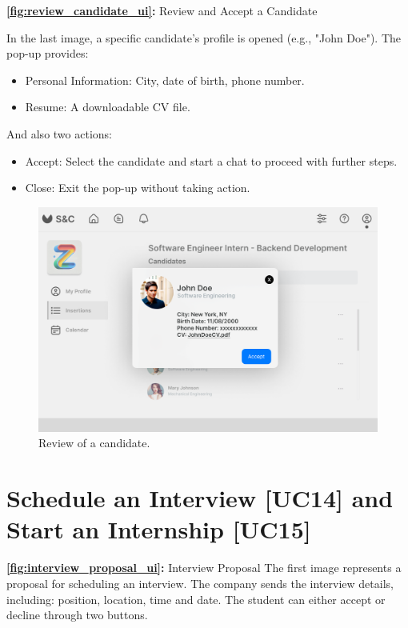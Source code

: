 \newpage

\textbf{\autoref{fig:review_candidate_ui}:} Review and Accept a Candidate

In the last image, a specific candidate’s profile is opened (e.g., "John Doe"). The pop-up provides:

\begin{itemize}
    \item
Personal Information: City, date of birth, phone number.
    \item
Resume: A downloadable CV file.
\end{itemize}

And also two actions:

\begin{itemize}
    \item
Accept: Select the candidate and start a chat to proceed with further steps.
    \item 
Close: Exit the pop-up without taking action.
\end{itemize}

\begin{figure}[H]
    \centering
    \includegraphics[width=0.75\linewidth]{DD/Images/UI/Insertions_selected_candidates_example.png}
    \caption{Review of a candidate.}
    \label{fig:review_candidate_ui}
\end{figure}

\newpage

\section{Schedule an Interview [UC14] and Start an Internship [UC15]}
\label{sec:UI6_interview_internship}%


\textbf{\autoref{fig:interview_proposal_ui}:} Interview Proposal
The first image represents a proposal for scheduling an interview. The company sends the interview details, including: position, location, time and date.
The student can either accept or decline through two buttons.

